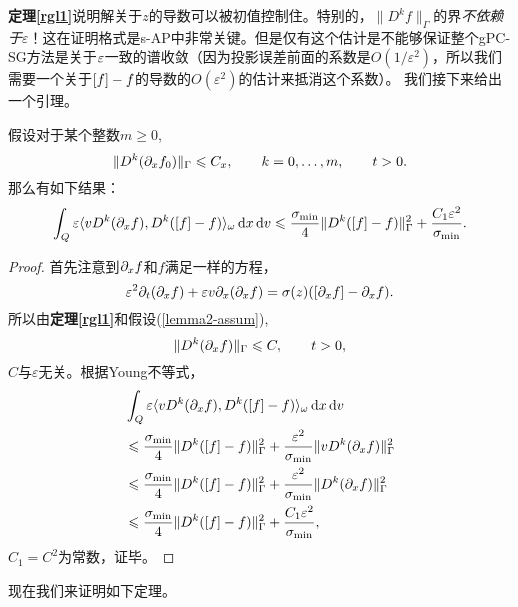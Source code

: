 \noindent
{\bf 定理\ref{rgl1}}说明解关于$z$的导数可以被初值控制住。特别的，$\|D^k f\|_{\Gamma}$的界{\it 不依赖于}$\varepsilon$！这在证明格式是s-AP中非常关键。但是仅有这个估计是不能够保证整个gPC-SG方法是关于$\varepsilon$一致的谱收敛（因为投影误差前面的系数是$O(1/\varepsilon^2)$，所以我们需要一个关于$\left[ f \right] - f$的导数的$O(\varepsilon^2)$的估计来抵消这个系数）。 我们接下来给出一个引理。
\begin{lem}\label{lemma2}
  假设对于某个整数$m \ge 0$,
  \begin{equation}\label{lemma2-assum}
    \|D^k(\partial_x f_0)\|_{\Gamma} \leqslant C_x, \qquad k=0,\dots,m, \qquad t>0.
  \end{equation}
  那么有如下结果：
  \begin{equation}
    \int_Q \varepsilon\langle vD^k(\partial_x f), D^k(\left[ f \right]-f) \rangle_\omega \mathop{}\!\mathrm{d} x\mathop{}\!\mathrm{d} v\leqslant \frac{\sigma_{\mathrm{min}}}{4}\|D^k(\left[ f \right]-f)\|^2_{\Gamma} + \frac{C_1\varepsilon^2}{\sigma_{\mathrm{min}}}.
  \end{equation}
\end{lem}
\begin{proof}
  首先注意到$\partial_x f$和$f$满足一样的方程，
  \begin{equation}
    \varepsilon^2\partial_t(\partial_x f) + \varepsilon v\partial_x(\partial_x f) = \sigma(z)(\left[ \partial_x f \right]-\partial_x f).
  \end{equation}
  所以由{\bf 定理\ref{rgl1}}和假设(\ref{lemma2-assum}),
  \begin{equation}
    \|D^k(\partial_x f)\|_{\Gamma} \leqslant C, \qquad t>0,
  \end{equation}
  $C$与$\varepsilon$无关。根据Young不等式，
  \begin{equation}
    \begin{split}
      & \int_Q\varepsilon\langle vD^k(\partial_x f), D^k(\left[ f \right]-f) \rangle_\omega\mathop{}\!\mathrm{d} x\mathop{}\!\mathrm{d} v
      \\
      & \leqslant \frac{\sigma_{\mathrm{min}}}{4}\|D^k(\left[ f \right]-f)\|^2_{\Gamma} + \frac{\varepsilon^2}{\sigma_{\mathrm{min}}}\|vD^k(\partial_x f)\|_{\Gamma}^2
      \\
      & \leqslant \frac{\sigma_{\mathrm{min}}}{4}\|D^k(\left[ f \right]-f)\|^2_{\Gamma} + \frac{\varepsilon^2}{\sigma_{\mathrm{min}}}\|D^k(\partial_x f)\|_{\Gamma}^2
      \\
      & \leqslant \frac{\sigma_{\mathrm{min}}}{4}\|D^k(\left[ f \right]-f)\|^2_{\Gamma} + \frac{C_1\varepsilon^2}{\sigma_{\mathrm{min}}},
    \end{split}
  \end{equation}
  $C_1 = C^2$为常数，证毕。
\end{proof}
现在我们来证明如下定理。

